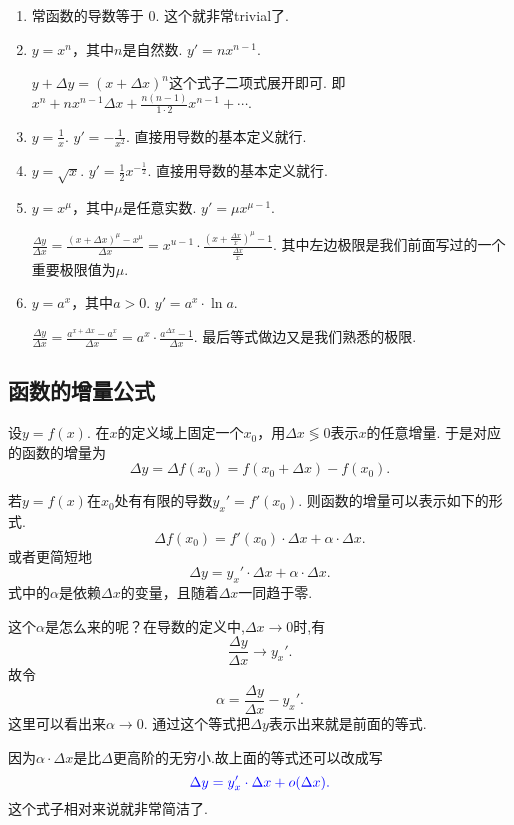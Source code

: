 \documentclass{article}
\begin{document}
\begin{enumerate}
	\item 常函数的导数等于{ \color{blue} $0$}. 这个就非常trivial了.
	\item $y=x^n$，其中$n$是自然数. {\color{blue} $y' = nx^{n-1}.$}

$y+\Delta y = (x+\Delta x)^n$这个式子二项式展开即可. 即$x^n + nx^{n-1}\Delta x + \frac{n(n-1)}{1 \cdot 2}x^{n-1}+ \cdots$.	
	
	\item $y=\frac{1}{x}$. {\color{blue} $y'=-\frac{1}{x^2}$}. 直接用导数的基本定义就行.
	\item $y=\sqrt{x}$. {\color{blue} $y' = \frac{1}{2}x^{-\frac{1}{2}}$.} 直接用导数的基本定义就行.
	\item $y=x^\mu$，其中$\mu$是任意实数. {\color{blue} $y' = \mu x^{\mu - 1}$.}
	
$\frac{\Delta y}{\Delta x} =  \frac{(x+\Delta x)^{\mu} - x^\mu}{\Delta x} =  x^{u-1} \cdot  \frac{(x+\frac{\Delta x}{x})^\mu - 1}{\frac{\Delta x}{x}}$. 其中左边极限是我们前面写过的一个重要极限值为$\mu$.	
	\item $y=a^x$，其中$a >0$. { \color{blue} $y' = a^x \cdot \ln a$.}
	
$\frac{\Delta y}{\Delta x} =\frac{a^{x + \Delta x} - a^x}{\Delta x} =  a^x \cdot \frac{a^{\Delta x} - 1}{\Delta x}$. 最后等式做边又是我们熟悉的极限.
\end{enumerate}

\newpage
\subsection{函数的增量公式}

设$y=f(x)$. 在$x$的定义域上固定一个$x_0$，用$\Delta x \lessgtr 0$表示$x$的任意增量. 于是对应的函数的增量为\[\Delta y = \Delta f(x_0) = f(x_0 + \Delta x) - f(x_0).\]

若$y=f(x)$在$x_0$处有有限的导数$y_x'=f'(x_0)$. 则函数的增量可以表示如下的形式.\[\Delta f(x_0) = f'(x_0) \cdot \Delta x + \alpha \cdot \Delta x.\]或者更简短地\[\Delta y = y_x' \cdot \Delta x + \alpha \cdot \Delta x.\]式中的$\alpha$是依赖$\Delta x$的变量，且随着$\Delta x$一同趋于零.

这个$\alpha$是怎么来的呢？在导数的定义中,$\Delta x \rightarrow 0$时,有\[\frac{\Delta y}{\Delta x} \rightarrow y_x'.\]故令\[\alpha = \frac{\Delta y}{\Delta x} - y_x'.\]这里可以看出来$\alpha \rightarrow 0$. 通过这个等式把$\Delta y$表示出来就是前面的等式. 

因为$\alpha \cdot \Delta x$是比$\Delta$更高阶的无穷小.故上面的等式还可以改成写\[ \color{blue} \Delta y = y_x' \cdot \Delta x + o(\Delta x).\]这个式子相对来说就非常简洁了.
\newpage
\end{document}
